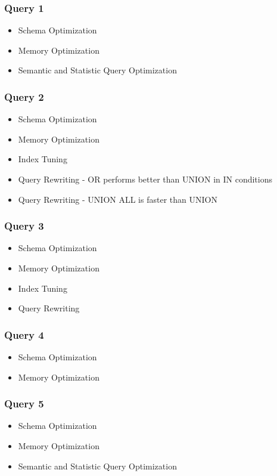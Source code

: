 \subsubsection{Query 1}
\begin{itemize}
    \item  Schema Optimization
    \item  Memory Optimization
    \item  Semantic and Statistic Query Optimization
\end{itemize}

\subsubsection{Query 2}
\begin{itemize}
    \item  Schema Optimization
    \item  Memory Optimization
    \item  Index Tuning
    \item  Query Rewriting -  OR performs better than UNION in IN conditions
    \item  Query Rewriting - UNION ALL is faster than UNION
\end{itemize}

\subsubsection{Query 3}
\begin{itemize}
    \item  Schema Optimization
    \item  Memory Optimization
    \item  Index Tuning
    \item  Query Rewriting
\end{itemize}

\subsubsection{Query 4}
\begin{itemize}
    \item  Schema Optimization
    \item  Memory Optimization
\end{itemize}

\subsubsection{Query 5}
\begin{itemize}
    \item  Schema Optimization
    \item  Memory Optimization
    \item  Semantic and Statistic Query Optimization
\end{itemize}
